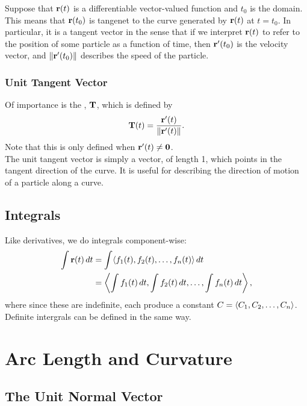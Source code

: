 Suppose that \(\mathbf{r}(t)\) is a differentiable vector-valued function and \(t_{0}\) is the domain. This means that \(\mathbf{r}(t_{0})\) is tangenet to the curve generated by \(\mathbf{r}(t)\) at \(t = t_{0}\). In particular, it is a tangent vector in the sense that if we interpret \(\mathbf{r}(t)\) to refer to the position of some particle as a function of time, then \(\mathbf{r}'(t_{0})\) is the velocity vector, and \(\|\mathbf{r}'(t_{0})\|\) describes the speed of the particle.

\subsubsection{Unit Tangent Vector}

Of importance is the , \(\mathbf{T}\), which is defined by
\[
    \mathbf{T}(t) = \frac{\mathbf{r}'(t)}{\|\mathbf{r}'(t)\|}.
\]
Note that this is only defined when \(\mathbf{r}'(t) \ne \mathbf{0}\). \\

The unit tangent vector is simply a vector, of length 1, which points in the tangent direction of the curve. It is useful for describing the direction of motion of a particle along a curve.

\subsection{Integrals}

Like derivatives, we do integrals component-wise:
\begin{align*}
    \int \mathbf{r}(t) \, dt &= \int \langle f_{1}(t),f_{2}(t),\ldots,f_{n}(t) \rangle \, dt \\
    &= \left\langle \int f_{1}(t) \, dt, \int f_{2}(t) \, dt, \ldots, \int f_{n}(t) \, dt \right\rangle,
\end{align*}
where since these are indefinite, each produce a constant \(C = \left\langle C_{1},C_{2},\ldots,C_{n} \right\rangle\). Definite intergrals can be defined in the same way.





\newpage

\section{Arc Length and Curvature}

\subsection{The Unit Normal Vector}

